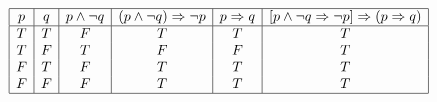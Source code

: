 \documentclass[11pt]{scrartcl}
\begin{document}
\begin{enumerate}[label=\alph*.]
{\begin{center}
		\begin{displaymath}
		\begin{array}{|c|c|c|c|c|c|c|}
			\hline
			p & q & p \land \lnot q & (p \land \lnot q) \Rightarrow \lnot p & p \Rightarrow q & [p\land \lnot q \Rightarrow \lnot p] \Rightarrow (p \Rightarrow q) \\
			\hline
			T & T & F & T & T & T\\
			T & F & T & F & F & T\\
			F & T & F & T & T & T\\
			F & F & F & T & T & T\\
			\hline
		\end{array}
		\end{displaymath}
		\end{center}
		}

\end{enumerate}
\end{document}
